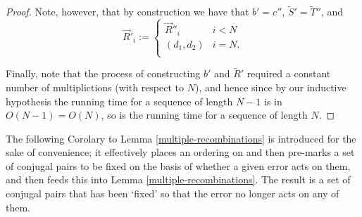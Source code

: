 \documentclass[twocolumn,showpacs,preprintnumbers,amsmath,amssymb,nofootinbib,pra,floatfix]{revtex4-1}
\newenvironment{remark}[1][Remark]{\begin{trivlist}
\item[\hskip \labelsep {\bfseries #1}]}{\end{trivlist}}
\newcommand{\lst}{\vec}
\newcommand{\set}{\tilde}
\begin{document}
\begin{proof}
Note, however, that by construction we have that $b'=c''$, $\set S'=\set T''$, and
$$\lst R'_i :=
\begin{cases}
\lst R''_i & i < N \\
(d_1,d_2) & i = N.\\
\end{cases}
$$

Finally, note that the process of constructing $b'$ and $\set R'$ required a constant number of multiplictions (with respect to $N$), and hence since by our inductive hypothesis the running time for a sequence of length $N-1$ is in $O(N-1)=O(N)$, so is the running time for a sequence of length $N$.
\end{proof}
\begin{remark}
The following Corolary to Lemma \ref{multiple-recombinations} is introduced for the sake of convenience;  it effectively places an ordering on and then pre-marks a set of conjugal pairs to be fixed on the basis of whether a given error acts on them, and then feeds this into Lemma \ref{multiple-recombinations}.  The result is a set of conjugal pairs that has been `fixed' so that the error no longer acts on any of them.
\end{remark}
\end{document}

